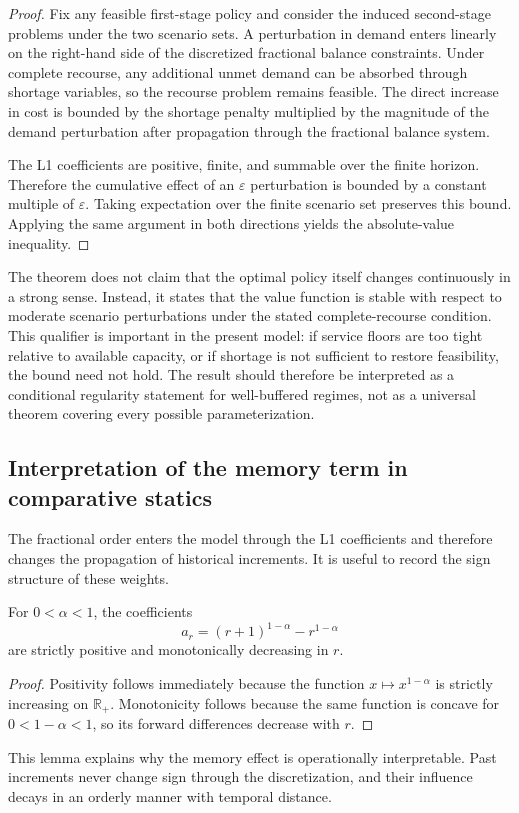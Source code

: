 \begin{proof}
Fix any feasible first-stage policy and consider the induced second-stage problems under the two scenario sets. A perturbation in demand enters linearly on the right-hand side of the discretized fractional balance constraints. Under complete recourse, any additional unmet demand can be absorbed through shortage variables, so the recourse problem remains feasible. The direct increase in cost is bounded by the shortage penalty multiplied by the magnitude of the demand perturbation after propagation through the fractional balance system.

The L1 coefficients are positive, finite, and summable over the finite horizon. Therefore the cumulative effect of an $\varepsilon$ perturbation is bounded by a constant multiple of $\varepsilon$. Taking expectation over the finite scenario set preserves this bound. Applying the same argument in both directions yields the absolute-value inequality.
\end{proof}

The theorem does not claim that the optimal policy itself changes continuously in a strong sense. Instead, it states that the value function is stable with respect to moderate scenario perturbations under the stated complete-recourse condition. This qualifier is important in the present model: if service floors are too tight relative to available capacity, or if shortage is not sufficient to restore feasibility, the bound need not hold. The result should therefore be interpreted as a conditional regularity statement for well-buffered regimes, not as a universal theorem covering every possible parameterization.

\subsection{Interpretation of the memory term in comparative statics}
The fractional order enters the model through the L1 coefficients and therefore changes the propagation of historical increments. It is useful to record the sign structure of these weights.

\begin{lemma}
For $0<\alpha<1$, the coefficients
\begin{equation}
 a_r=(r+1)^{1-\alpha}-r^{1-\alpha}
\end{equation}
are strictly positive and monotonically decreasing in $r$.
\end{lemma}

\begin{proof}
Positivity follows immediately because the function $x\mapsto x^{1-\alpha}$ is strictly increasing on $\mathbb{R}_+$. Monotonicity follows because the same function is concave for $0<1-\alpha<1$, so its forward differences decrease with $r$.
\end{proof}

This lemma explains why the memory effect is operationally interpretable. Past increments never change sign through the discretization, and their influence decays in an orderly manner with temporal distance.


